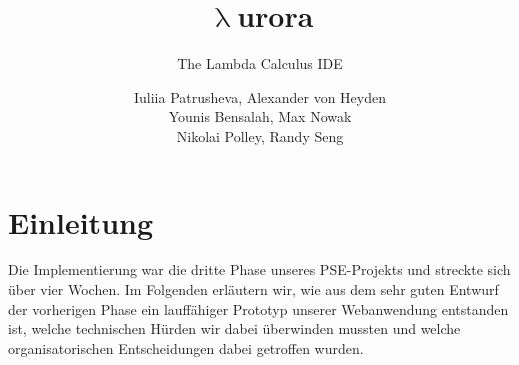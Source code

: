 \documentclass[parskip=full,11pt,twoside]{scrartcl}
\title{\textbf{$\uplambda$}urora}
\subtitle{The Lambda Calculus IDE}
\author{Iuliia Patrusheva, Alexander von Heyden\\
Younis Bensalah, Max Nowak\\
Nikolai Polley, Randy Seng}
\begin{document}
\maketitle
\tableofcontents
\newpage
\section{Einleitung}
Die Implementierung war die dritte Phase unseres PSE-Projekts und streckte sich über vier Wochen.
Im Folgenden erläutern wir, wie aus dem sehr guten Entwurf der vorherigen Phase ein lauffähiger Prototyp unserer Webanwendung
entstanden ist, welche technischen Hürden wir dabei überwinden mussten und welche organisatorischen Entscheidungen
dabei getroffen wurden.
\newline
\newpage

\end{document}
